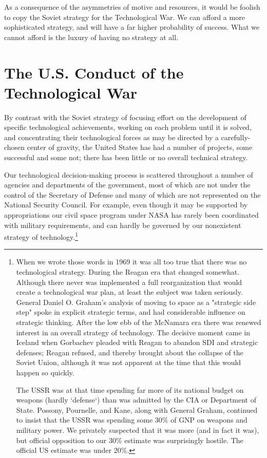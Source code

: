 As a consequence of the asymmetries of motive and resources, it would be foolish to copy the Soviet strategy for the Technological War. We can afford a more sophisticated strategy, and will have a far higher probability of success. What we cannot afford is the luxury of having no strategy at all.

\section{The U.S. Conduct of the Technological War}
By contrast with the Soviet strategy of focusing effort on the development of specific technological achievements, working on each problem until it is solved, and concentrating their technological forces as may be directed by a carefully-chosen center of gravity, the United States has had a number of projects, some successful and some not; there has been little or no overall technical strategy.

Our technological decision-making process is scattered throughout a number of agencies and departments of the government, most of which are not under the control of the Secretary of Defense and many of which are not represented on the National Security Council. For example, even though it may be supported by appropriations our civil space program under NASA has rarely been coordinated with military requirements, and can hardly be governed by our nonexistent strategy of technology.\footnote{
When we wrote those words in 1969 it was all too true that there was no technological strategy. During the Reagan era that changed somewhat. Although there never was implemented a full reorganization that would create a technological war plan, at least the subject was taken seriously. General Daniel O. Graham's analysis of moving to space as a "strategic side step" spoke in explicit strategic terms, and had considerable influence on strategic thinking.
After the low ebb of the McNamara era there was renewed interest in an overall strategy of technology. The decisive moment came in Iceland when Gorbachev pleaded with Reagan to abandon SDI and strategic defenses; Reagan refused, and thereby brought about the collapse of the Soviet Union, although it was not apparent at the time that this would happen so quickly.

The USSR was at that time spending far more of its national budget on weapons (hardly `defense`) than was admitted by the CIA or Department of State. Possony, Pournelle, and Kane, along with General Graham, continued to insist that the USSR was spending some 30\% of GNP on weapons and military power. We privately suspected that it was more (and in fact it was), but official opposition to our 30\% estimate was surprisingly hostile. The official US estimate was under 20\%.}

